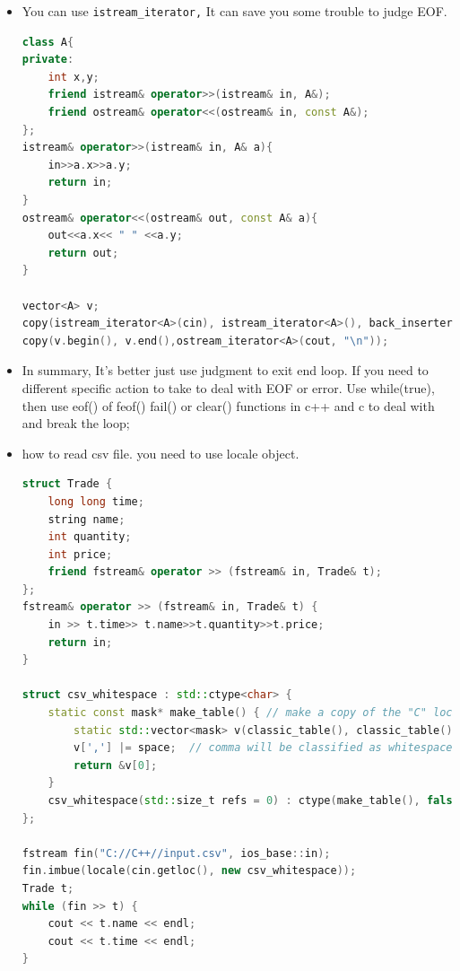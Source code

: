 \documentclass[a4paper,11pt,twoside]{book}
\begin{document}
\begin{itemize}
\begin{lstlisting}[numbers=none]
while(!issapce(cin.get()))
	continue;  //method 2
	
basic_istream& ignore(streamsize _Count = 1, \
int_type _Delim = traits_type::eof());  //method 3
cin.ignore(5, 'a');
cin.ignore(numeric_limits<streamsize>::max(), '\n');
\end{lstlisting}
	
	\item You can use \texttt{istream\_iterator,} It can save you some trouble to judge EOF.
	
\begin{lstlisting}[frame=single, language=c++]
class A{
private:
	int x,y;
	friend istream& operator>>(istream& in, A&);
	friend ostream& operator<<(ostream& in, const A&);
};	
istream& operator>>(istream& in, A& a){
	in>>a.x>>a.y;
	return in;
}	
ostream& operator<<(ostream& out, const A& a){
	out<<a.x<< " " <<a.y;
	return out;
}
	
vector<A> v;
copy(istream_iterator<A>(cin), istream_iterator<A>(), back_inserter(v));
copy(v.begin(), v.end(),ostream_iterator<A>(cout, "\n"));
\end{lstlisting}
	
	\item In summary, It's better just use judgment to exit end loop.  If you need to different specific action to take to deal with EOF or error. Use while(true), then use eof() of feof() fail() or clear() functions in c++ and c to deal with and break the loop; 
	
	\item how to read csv file. you need to use locale object. 
\begin{lstlisting}[frame=single, language=c++]	
struct Trade {
	long long time;
	string name;
	int quantity;
	int price;
	friend fstream& operator >> (fstream& in, Trade& t);
};
fstream& operator >> (fstream& in, Trade& t) {
	in >> t.time>> t.name>>t.quantity>>t.price;
	return in;
}

struct csv_whitespace : std::ctype<char> {
	static const mask* make_table() { // make a copy of the "C" locale table
		static std::vector<mask> v(classic_table(), classic_table() + table_size);
		v[','] |= space;  // comma will be classified as whitespace
		return &v[0];
	}
	csv_whitespace(std::size_t refs = 0) : ctype(make_table(), false, refs) {}
};
	
fstream fin("C://C++//input.csv", ios_base::in);
fin.imbue(locale(cin.getloc(), new csv_whitespace));
Trade t;
while (fin >> t) {
	cout << t.name << endl;
	cout << t.time << endl;
}		
\end{lstlisting}	

\end{itemize}
\end{document}
